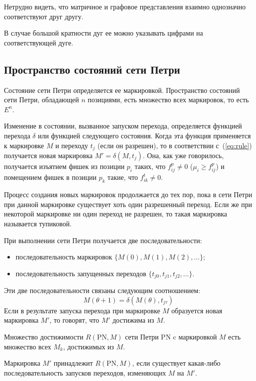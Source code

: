 Нетрудно видеть, что матричное и графовое представления взаимно однозначно соответствуют друг другу.

В случае большой кратности дуг ее можно указывать цифрами на соответствующей дуге.

\subsection{Пространство состояний сети Петри}

Состояние сети Петри определяется ее маркировкой. Пространство состояний сети Петри, обладающей $n$ позициями, есть множество всех маркировок, то есть $E^n$. 

Изменение в состоянии, вызванное запуском перехода, определяется функцией перехода $\delta$ или функцией следующего состояния. Когда эта функция применяется к маркировке $M$ и переходу $t_j$ (если он разрешен), то в соответствии с~(\ref{eq:rule}) получается новая маркировка ${M' = \delta(M, t_j)}$. Она, как уже говорилось, получается изъятием фишек из позиции $p_i$ таких, что ${f_{ij}^p\neq 0}$ (${\mu_i\geqslant f_{ij}^p}$) и помещением фишек в позиции $p_k$ такие, что ${f_{ik}^t\neq 0}$. 

Процесс создания новых маркировок продолжается до тех пор, пока в сети Петри при данной маркировке существует хоть один разрешенный переход. Если же при некоторой маркировке ни один переход не разрешен, то такая маркировка называется тупиковой.

При выполнении сети Петри получается две последовательности:

\begin{itemize}
    \item последовательность маркировок ${\{ M(0), M(1), M(2), \dots \}}$;
    \item последовательность запущенных переходов ${\{ t_{j0}, t_{j1}, t_{j2}, \dots \}}$.
\end{itemize}

Эти две последовательности связаны следующим соотношением:
%
\begin{equation*}
M(\theta + 1) = \delta(M(\theta), t_{j\tau})
\end{equation*}
%
Если в результате запуска перехода при маркировке $M$ образуется новая маркировка $M'$, то говорят, что $M'$ достижима из $M$.

Множество достижимости ${R(\text{PN}, M)}$ сети Петри PN c маркировкой $M$ есть множество всех $M_k$, достижимых из $M$.

Маркировка $M'$ принадлежит $R(\text{PN}, M)$, если существует какая-либо последовательность запусков переходов, изменяющих $M$ на $M'$.

